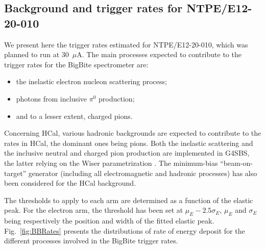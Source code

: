 \subsection{Background and trigger rates for NTPE/E12-20-010}

We present here the trigger rates estimated for NTPE/E12-20-010, which was planned to run at 30~$\mu$A.
The main processes expected to contribute to the trigger rates for the BigBite spectrometer are:
%
\begin{itemize}
\item{the inelastic electron nucleon scattering process;}
\item{photons from inclusive $\pi^0$ production;}
\item{and to a lesser extent, charged pions.}
\end{itemize}
%
Concerning HCal, various hadronic backgrounds are expected to contribute to the rates in HCal, the dominant ones being pions.
Both the inelastic scattering and the inclusive neutral and charged pion production are implemented in G4SBS, the latter relying on the Wiser parametrization \cite{wiser}.
The minimum-bias ``beam-on-target'' generator (including all electromagnetic and hadronic processes) has also been considered for the HCal background.

The thresholds to apply to each arm are determined as a function of the elastic peak.
For the electron arm, the threshold has been set at $\mu_E - 2.5 \sigma_E$,  $\mu_E$ and $\sigma_E$ being respectively the position and width of the fitted elastic peak. 
Fig.~\ref{fig:BBRates} presents the distributions of rate of energy deposit for the different processes involved in the BigBite trigger rates. 

